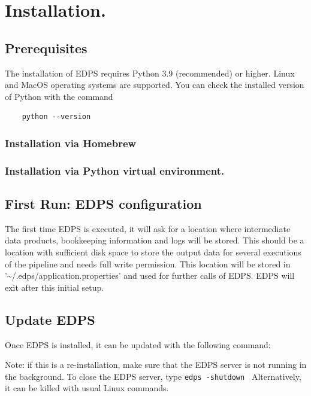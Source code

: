 
\section{Installation.}
\label{sec:edps_installation}


\subsection{Prerequisites}

The installation of EDPS requires Python 3.9 (recommended) or higher. Linux and MacOS operating systems are supported. You can check the installed version of Python with the command
\begin{verbatim}
    python --version
\end{verbatim}


\subsubsection{Installation via Homebrew}

\subsubsection{Installation via Python virtual environment.}


\subsection{First Run: EDPS configuration}


The first time EDPS is executed, it will ask for a location where intermediate data products, bookkeeping information and logs will be stored. This should be a location with sufficient disk space to store the output data for several executions of the pipeline and needs full write permission. This location will be stored in '\textasciitilde/.edps/application.properties' and used for further calls of EDPS. EDPS will exit after this initial setup. 



\subsection{Update EDPS}
Once  EDPS is installed, it can be updated with the following command:


Note: if this is a re-installation, make sure that the EDPS server is not running in the background. To close the EDPS server, type 
\verb|edps -shutdown |
Alternatively, it can be killed with usual Linux commands.
